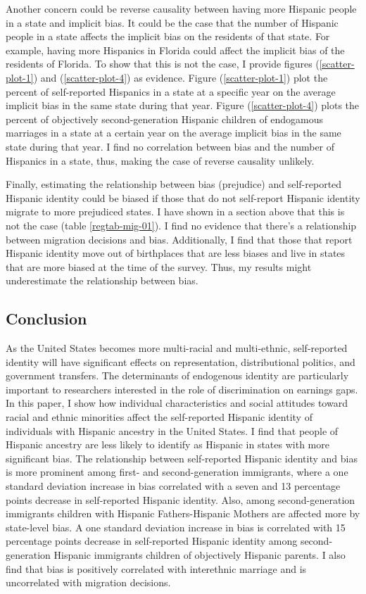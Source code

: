 \documentclass[12pt, fullpage]{article}
\begin{document}
Another concern could be reverse causality between having more Hispanic people in a state and implicit bias. It could be the case that the number of Hispanic people in a state affects the implicit bias on the residents of that state. For example, having more Hispanics in Florida could affect the implicit bias of the residents of Florida. To show that this is not the case, I provide figures (\ref{scatter-plot-1}) and (\ref{scatter-plot-4}) as evidence. Figure (\ref{scatter-plot-1}) plot the percent of self-reported Hispanics in a state at a specific year on the average implicit bias in the same state during that year. Figure (\ref{scatter-plot-4}) plots the percent of objectively second-generation Hispanic children of endogamous marriages in a state at a certain year on the average implicit bias in the same state during that year. I find no correlation between bias and the number of Hispanics in a state, thus, making the case of reverse causality unlikely. 

Finally, estimating the relationship between bias (prejudice) and self-reported Hispanic identity could be biased if those that do not self-report Hispanic identity migrate to more prejudiced states. I have shown in a section above that this is not the case (table \ref{regtab-mig-01}). I find no evidence that there's a relationship between migration decisions and bias. Additionally, I find that those that report Hispanic identity move out of birthplaces that are less biases and live in states that are more biased at the time of the survey. Thus, my results might underestimate the relationship between bias. 

\subsection{Conclusion}\label{sec:conc}

As the United States becomes more multi-racial and multi-ethnic, self-reported identity will have significant effects on representation, distributional politics, and government transfers. The determinants of endogenous identity are particularly important to researchers interested in the role of discrimination on earnings gaps. In this paper, I show how individual characteristics and social attitudes toward racial and ethnic minorities affect the self-reported Hispanic identity of individuals with Hispanic ancestry in the United States. I find that people of Hispanic ancestry are less likely to identify as Hispanic in states with more significant bias. The relationship between self-reported Hispanic identity and bias is more prominent among first- and second-generation immigrants, where a one standard deviation increase in bias correlated with a seven and 13 percentage points decrease in self-reported Hispanic identity. Also, among second-generation immigrants children with Hispanic Fathers-Hispanic Mothers are affected more by state-level bias. A one standard deviation increase in bias is correlated with 15 percentage points decrease in self-reported Hispanic identity among second-generation Hispanic immigrants children of objectively Hispanic parents. I also find that bias is positively correlated with interethnic marriage and is uncorrelated with migration decisions.
\end{document}

